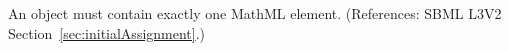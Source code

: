 An \InitialAssignment object must contain exactly one MathML 
element.  (References: SBML L3V2 Section~\ref{sec:initialAssignment}.)

